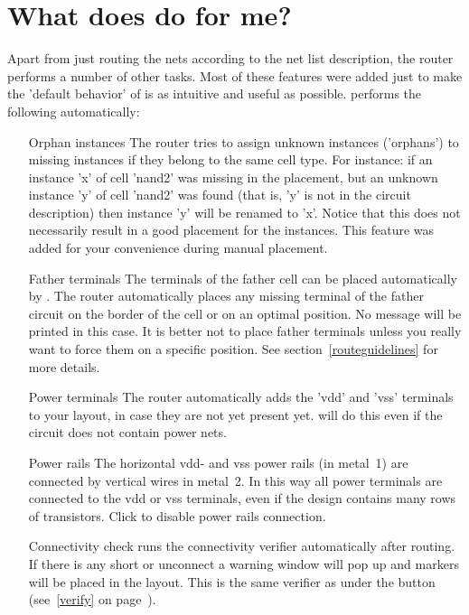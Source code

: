 \section{What does \protect{} do for me?}
Apart from just routing the nets according to the net list description, the
router performs a number of other tasks. Most of these features were added just
to make the 'default behavior' of  is as intuitive and useful as
possible.  performs the following automatically:
\begin{itemize}
\item[Orphan instances]
The router tries to assign unknown instances ('orphans') to missing instances
if they belong to the same cell type.  For instance: if an instance 'x' of
cell 'nand2' was missing in the placement, but an unknown instance 'y' of cell
'nand2' was found (that is, 'y' is not in the circuit description) then
instance 'y' will be renamed to 'x'. Notice that this does not necessarily
result in a good placement for the instances.  This feature was added for your
convenience during manual placement.
\item[Father terminals]
The terminals of the father cell can be placed automatically by .
The router automatically places any missing terminal of the father circuit on
the border of the cell or on an optimal position. No message will be printed in
this case. It is better not to place father terminals unless you really want to
force them on a specific position. See section~\ref{routeguidelines} for more
details.
\item[Power terminals]
The router automatically adds the 'vdd' and 'vss' terminals to your layout,
in case they are not yet present yet.  will do this even
if the circuit does not contain power nets.  
\item[Power rails]
The horizontal vdd- and vss power rails (in metal~1) are connected by vertical
wires in metal~2. In this way all power terminals are connected to the vdd or
vss terminals, even if the design contains many rows of transistors.  Click
 to disable power rails connection.
\item[Connectivity check]
 runs the connectivity verifier automatically after routing. 
If there is any short or unconnect a warning window will pop up and markers
will be placed in the layout. This is the same verifier as under the button
 (see~\ref{verify} on page~\pageref{verify}).
\end{itemize}
